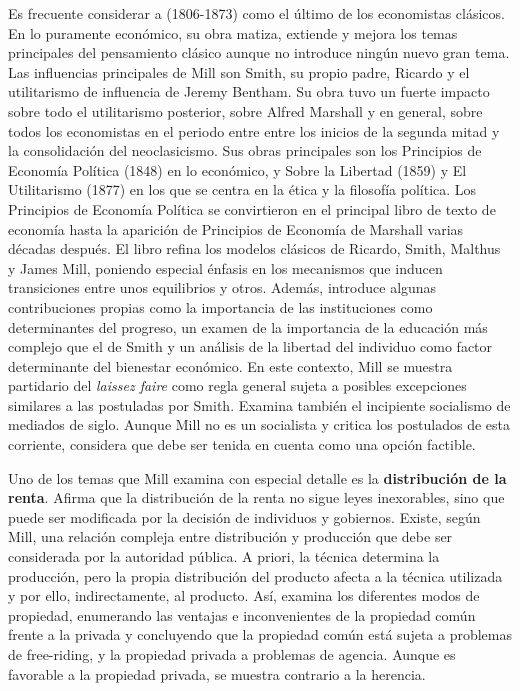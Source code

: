 \documentclass{nuevotema}
\begin{document}
Es frecuente considerar a  (1806-1873) como el último de los economistas clásicos. En lo puramente económico, su obra matiza, extiende y mejora los temas principales del pensamiento clásico aunque no introduce ningún nuevo gran tema. Las influencias principales de Mill son Smith, su propio padre, Ricardo y el utilitarismo de influencia de Jeremy Bentham. Su obra tuvo un fuerte impacto sobre todo el utilitarismo posterior, sobre Alfred Marshall y en general, sobre todos los economistas en el periodo entre entre los inicios de la segunda mitad y la consolidación del neoclasicismo. Sus obras principales son los Principios de Economía Política (1848) en lo económico, y Sobre la Libertad (1859) y El Utilitarismo (1877) en los que se centra en la ética y la filosofía política. Los Principios de Economía Política se convirtieron en el principal libro de texto de economía hasta la aparición de Principios de Economía de Marshall varias décadas después. El libro refina los modelos clásicos de Ricardo, Smith, Malthus y James Mill, poniendo especial énfasis en los mecanismos que inducen transiciones entre unos equilibrios y otros. Además, introduce algunas contribuciones propias como la importancia de las instituciones como determinantes del progreso, un examen de la importancia de la educación más complejo que el de Smith y un análisis de la libertad del individuo como factor determinante del bienestar económico. En este contexto, Mill se muestra partidario del \textit{laissez faire} como regla general sujeta a posibles excepciones similares a las postuladas por Smith. Examina también el incipiente socialismo de mediados de siglo. Aunque Mill no es un socialista y critica los postulados de esta corriente, considera que debe ser tenida en cuenta como una opción factible.

Uno de los temas que Mill examina con especial detalle es la \textbf{distribución de la renta}. Afirma que la distribución de la renta no sigue leyes inexorables, sino que puede ser modificada por la decisión de individuos y gobiernos. Existe, según Mill, una relación compleja entre distribución y producción que debe ser considerada por la autoridad pública. A priori, la técnica determina la producción, pero la propia distribución del producto afecta a la técnica utilizada y por ello, indirectamente, al producto. Así, examina los diferentes modos de propiedad, enumerando las ventajas e inconvenientes de la propiedad común frente a la privada y concluyendo que la propiedad común está sujeta a problemas de free-riding, y la propiedad privada a problemas de agencia. Aunque es favorable a la propiedad privada, se muestra contrario a la herencia.
\end{document}
